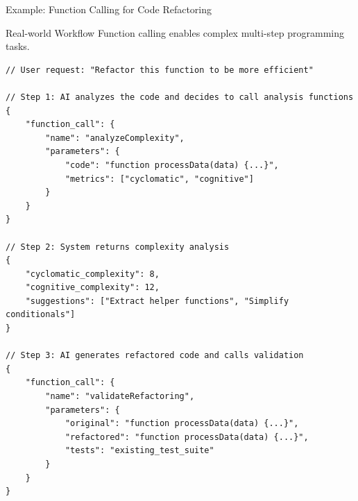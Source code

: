 \documentclass{beamer}
\begin{document}
\begin{frame}[t,fragile]{Example: Function Calling for Code Refactoring}
    \begin{block}{Real-world Workflow}
        Function calling enables complex multi-step programming tasks.
    \end{block}
    
    \begin{lstlisting}[style=code, basicstyle=\ttfamily\tiny]
// User request: "Refactor this function to be more efficient"

// Step 1: AI analyzes the code and decides to call analysis functions
{
    "function_call": {
        "name": "analyzeComplexity",
        "parameters": {
            "code": "function processData(data) {...}",
            "metrics": ["cyclomatic", "cognitive"]
        }
    }
}

// Step 2: System returns complexity analysis
{
    "cyclomatic_complexity": 8,
    "cognitive_complexity": 12,
    "suggestions": ["Extract helper functions", "Simplify conditionals"]
}

// Step 3: AI generates refactored code and calls validation
{
    "function_call": {
        "name": "validateRefactoring",
        "parameters": {
            "original": "function processData(data) {...}",
            "refactored": "function processData(data) {...}",
            "tests": "existing_test_suite"
        }
    }
}
    \end{lstlisting}
\end{frame}
\end{document}
